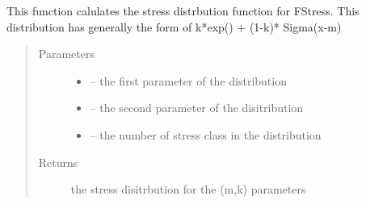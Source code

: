 \documentclass[letterpaper,10pt,english]{sphinxmanual}
\begin{document}
\begin{fulllineitems}
\label{\detokenize{index:src.fstress.denstress}}
This function calulates the stress distrbution function for FStress. This distribution has generally the form
of k*exp() + (1-k)* Sigma(x-m)
\begin{quote}\begin{description}
\item[{Parameters}] \leavevmode\begin{itemize}
\item {} 
 -- the first parameter of the distribution

\item {} 
 -- the second parameter of the disitribution

\item {} 
 -- the number of stress class in the distribution

\end{itemize}

\item[{Returns}] \leavevmode
the stress disitrbution for the (m,k) parameters

\end{description}\end{quote}

\end{fulllineitems}

\end{document}
